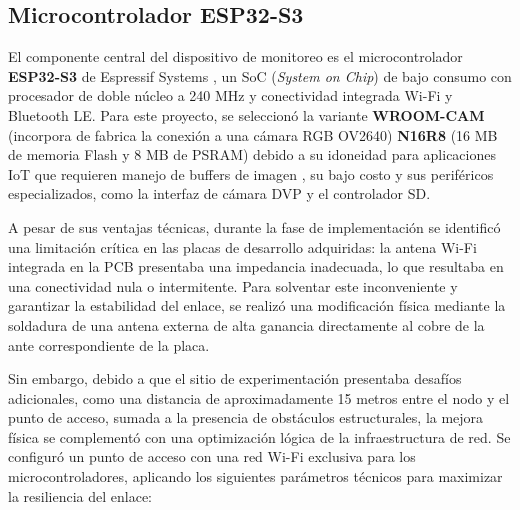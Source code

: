     \subsection{Microcontrolador ESP32-S3}
    \label{subsec:hardware_esp32s3}
    El componente central del dispositivo de monitoreo es el microcontrolador \textbf{ESP32-S3} de Espressif Systems , un SoC (\textit{System on Chip}) de bajo consumo con procesador de doble núcleo a 240 MHz y conectividad integrada Wi-Fi y Bluetooth LE. Para este proyecto, se seleccionó la variante \textbf{WROOM-CAM} (incorpora de fabrica la conexión a una cámara RGB OV2640) \textbf{N16R8} (16 MB de memoria Flash y 8 MB de PSRAM) debido a su idoneidad para aplicaciones IoT que requieren manejo de buffers de imagen , su bajo costo y sus periféricos especializados, como la interfaz de cámara DVP y el controlador SD.

    A pesar de sus ventajas técnicas, durante la fase de implementación se identificó una limitación crítica en las placas de desarrollo adquiridas: la antena Wi-Fi integrada en la PCB presentaba una impedancia inadecuada, lo que resultaba en una conectividad nula o intermitente. Para solventar este inconveniente y garantizar la estabilidad del enlace, se realizó una modificación física mediante la soldadura de una antena externa de alta ganancia directamente al cobre de la ante correspondiente de la placa.

    Sin embargo, debido a que el sitio de experimentación presentaba desafíos adicionales, como una distancia de aproximadamente 15 metros entre el nodo y el punto de acceso, sumada a la presencia de obstáculos estructurales, la mejora física se complementó con una optimización lógica de la infraestructura de red. Se configuró un punto de acceso con una red Wi-Fi exclusiva para los microcontroladores, aplicando los siguientes parámetros técnicos para maximizar la resiliencia del enlace:

